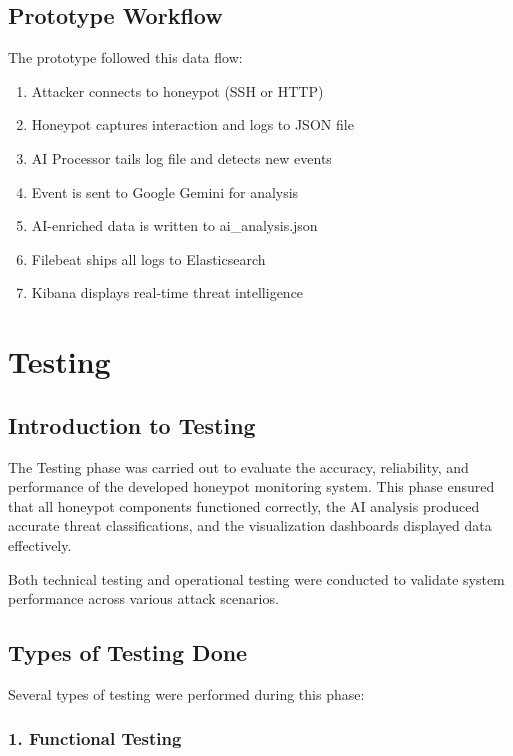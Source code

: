 \documentclass[12pt,a4paper]{report}
\begin{document}
\section{Prototype Workflow}

The prototype followed this data flow:

\begin{enumerate}
\item Attacker connects to honeypot (SSH or HTTP)
\item Honeypot captures interaction and logs to JSON file
\item AI Processor tails log file and detects new events
\item Event is sent to Google Gemini for analysis
\item AI-enriched data is written to ai\_analysis.json
\item Filebeat ships all logs to Elasticsearch
\item Kibana displays real-time threat intelligence
\end{enumerate}


\chapter{Testing}
\thispagestyle{fancy}

\section{Introduction to Testing}

The Testing phase was carried out to evaluate the accuracy, reliability, and performance of the developed honeypot monitoring system. This phase ensured that all honeypot components functioned correctly, the AI analysis produced accurate threat classifications, and the visualization dashboards displayed data effectively.

Both technical testing and operational testing were conducted to validate system performance across various attack scenarios.

\section{Types of Testing Done}

Several types of testing were performed during this phase:

\subsection*{1. Functional Testing}
\end{document}
